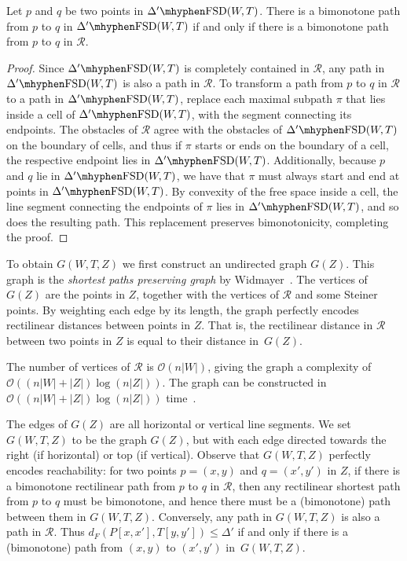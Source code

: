\documentclass[a4paper,UKenglish,cleveref,thm-restate,notab]{lipics-v2021}
\newcommand{\dF}{\ensuremath{d_F}}
\newcommand{\FSD}[1][\Delta'] {\ensuremath{#1}\mhyphen\mathrm{FSD}}
\newcommand{\bigO}{\mathcal{O}}
\begin{document}
    \begin{lemma}
    \label{lem:simplified_FSD}
        Let $p$ and $q$ be two points in $\FSD(W, T)$.
        There is a bimonotone path from $p$ to $q$ in $\FSD(W, T)$ if and only if there is a bimonotone path from $p$ to $q$ in $\mathcal{R}$.
    \end{lemma}
    \begin{proof}
        Since $\FSD(W, T)$ is completely contained in $\mathcal{R}$, any path in $\FSD(W, T)$ is also a path in $\mathcal{R}$.
        To transform a path from $p$ to $q$ in $\mathcal{R}$ to a path in $\FSD(W, T)$, replace each maximal subpath $\pi$ that lies inside a cell of $\FSD(W, T)$, with the segment connecting its endpoints.
        The obstacles of $\mathcal{R}$ agree with the obstacles of $\FSD(W, T)$ on the boundary of cells, and thus if $\pi$ starts or ends on the boundary of a cell, the respective endpoint lies in $\FSD(W, T)$.
        Additionally, because $p$ and $q$ lie in $\FSD(W, T)$, we have that $\pi$ must always start and end at points in $\FSD(W, T)$.
        By convexity of the free space inside a cell, the line segment connecting the endpoints of $\pi$ lies in $\FSD(W, T)$, and so does the resulting path.
        This replacement preserves bimonotonicity, completing the proof.
    \end{proof}

    \noindent
    To obtain $G(W, T, Z)$ we first construct an undirected graph $G(Z)$.
    This graph is the \emph{shortest paths preserving graph} by Widmayer~\cite{widmayer91rectilinear_graphs}.
    The vertices of $G(Z)$ are the points in $Z$, together with the vertices of $\mathcal{R}$ and some Steiner points.
    By weighting each edge by its length, the graph perfectly encodes rectilinear distances between points in $Z$.
    That is, the rectilinear distance in $\mathcal{R}$ between two points in $Z$ is equal to their distance in~$G(Z)$.
    
    The number of vertices of $\mathcal{R}$ is $\bigO(n |W|)$, giving the graph a complexity of $\bigO((n |W| + |Z|) \log (n|Z|))$.
    The graph can be constructed in $\bigO((n |W| + |Z|) \log (n|Z|))$ time~\cite{widmayer91rectilinear_graphs}.
    
    The edges of $G(Z)$ are all horizontal or vertical line segments.
    We set $G(W, T, Z)$ to be the graph $G(Z)$, but with each edge directed towards the right (if horizontal) or top (if vertical).
    Observe that $G(W, T, Z)$ perfectly encodes reachability: for two points $p = (x, y)$ and $q = (x', y')$ in $Z$, if there is a bimonotone rectilinear path from $p$ to $q$ in $\mathcal{R}$, then any rectilinear shortest path from $p$ to $q$ must be bimonotone, and hence there must be a (bimonotone) path between them in $G(W, T, Z)$.
    Conversely, any path in $G(W, T, Z)$ is also a path in $\mathcal{R}$.
    Thus $\dF(P[x, x'], T[y, y']) \leq \Delta'$ if and only if there is a (bimonotone) path from $(x, y)$ to $(x', y')$ in~$G(W, T, Z)$.
\end{document}
